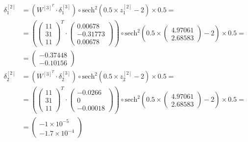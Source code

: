 \documentclass[12pt]{article}
\begin{document}
\begin{enumerate}[leftmargin=\labelsep]
        \begingroup
        \allowdisplaybreaks
          \begin{align*}
            \delta^{[2]}_1 &= \left(W^{[3]^{T}} \cdot \delta^{[3]}_1\right) \circ  \text{sech}^{2}\left(0.5\times z^{[2]}_1 - 2\right) \times 0.5 = \\
             &= \left(\begin{pmatrix} 1 1 \\ 3 1 \\ 1 1\end{pmatrix}^{T} \cdot \begin{pmatrix} 0.00678 \\ -0.31773 \\ 0.00678 \end{pmatrix}\right) \circ \text{sech}^{2}\left(0.5\times\begin{pmatrix} 4.97061 \\ 2.68583\end{pmatrix} - 2\right) \times 0.5 = \\
             &= \begin{pmatrix} -0.37448 \\ -0.10156 \end{pmatrix} \\
            \delta^{[2]}_2 &= \left(W^{[3]^{T}} \cdot \delta^{[3]}_2\right) \circ  \text{sech}^{2}\left(0.5\times z^{[2]}_2 - 2\right) \times 0.5 = \\
             &= \left(\begin{pmatrix} 1 1 \\ 3 1 \\ 1 1\end{pmatrix}^{T} \cdot \begin{pmatrix} -0.0266 \\ 0 \\ -0.00018 \end{pmatrix}\right) \circ \text{sech}^{2}\left(0.5\times\begin{pmatrix} 4.97061 \\ 2.68583\end{pmatrix} - 2\right) \times 0.5 = \\
             &= \begin{pmatrix} -1 \times 10^{-5} \\ -1.7 \times 10^{-4} \end{pmatrix}
          \end{align*}
        \endgroup


\end{enumerate}
\end{document}
